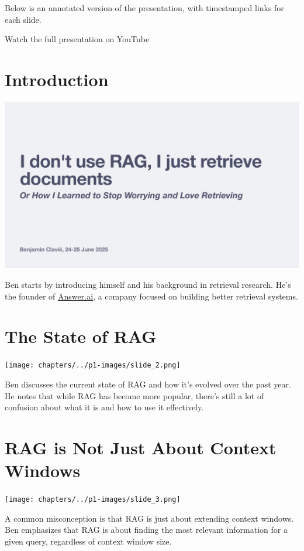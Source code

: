 \documentclass[
  letterpaper,
  oneside]{scrbook}
\begin{document}
Below is an annotated version of the presentation, with timestamped
links for each slide.

Watch the full presentation on YouTube

\section{Introduction}\label{introduction-1}

\includegraphics{chapters/../p1-images/slide_1.png}

Ben starts by introducing himself and his background in retrieval
research. He's the founder of \href{https://answer.ai/}{Answer.ai}, a
company focused on building better retrieval systems.

\section{The State of RAG}\label{the-state-of-rag}

\texttt{[image: chapters/../p1-images/slide\_2.png]}

Ben discusses the current state of RAG and how it's evolved over the
past year. He notes that while RAG has become more popular, there's
still a lot of confusion about what it is and how to use it effectively.

\section{RAG is Not Just About Context
Windows}\label{rag-is-not-just-about-context-windows}

\texttt{[image: chapters/../p1-images/slide\_3.png]}

A common misconception is that RAG is just about extending context
windows. Ben emphasizes that RAG is about finding the most relevant
information for a given query, regardless of context window size.
\end{document}
